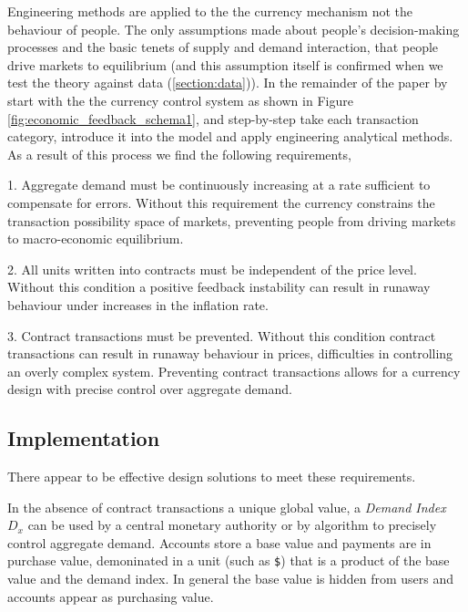 
Engineering methods are applied to the the currency mechanism not the behaviour of people. The only
assumptions made about people's decision-making processes and the basic tenets of supply and demand
interaction, that people drive markets to equilibrium (and this assumption itself is confirmed when
we test the theory against data (\ref{section:data})). In the remainder of the paper by start with
the the currency control system as shown in Figure \ref{fig:economic_feedback_schema1}, and
step-by-step take each transaction category, introduce it into the model and apply engineering
analytical methods. As a result of this process we find the following requirements, 

1. Aggregate demand must be continuously increasing at a rate sufficient to compensate for errors.
Without this requirement the currency constrains the transaction possibility space of markets,
preventing people from driving markets to macro-economic equilibrium.

2. All units written into contracts must be independent of the price level. Without this condition a
positive feedback instability can result in runaway behaviour under increases in the inflation rate.

3. Contract transactions must be prevented. Without this condition contract transactions can result
in runaway behaviour in prices, difficulties in controlling an overly complex system. Preventing
contract transactions allows for a currency design with precise control over aggregate demand.

\subsection{Implementation}
    
There appear to be effective design solutions to meet these requirements.

In the absence of contract transactions a unique global value, a \emph{Demand Index} $D_x$ can be
used by a central monetary authority or by algorithm to precisely control aggregate demand. Accounts
store a base value and payments are in purchase value, demoninated in a unit (such as \verb|$|) that
is a product of the base value and the demand index. In general the base value is hidden from users
and accounts appear as purchasing value.

